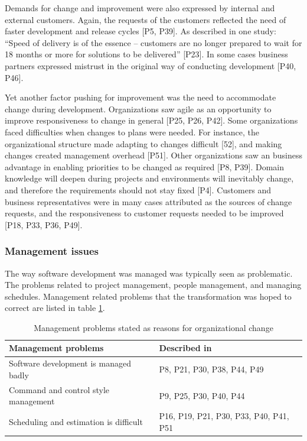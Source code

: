 \documentclass[preprint,authoryear,12pt]{elsarticle}
\begin{document}
Demands for change and improvement were also expressed by internal and external
customers. Again, the requests of the customers reflected the need of faster
development and release cycles [P5, P39]. As described in one study: ``Speed of
delivery is of the essence -- customers are no longer prepared to wait for 18
months or more for solutions to be delivered'' [P23]. In some cases business
partners expressed mistrust in the original way of conducting development [P40,
P46].

Yet another factor pushing for improvement was the need to accommodate change
during development. Organizations saw agile as an opportunity to improve
responsiveness to change in general [P25, P26, P42].
Some organizations faced difficulties when changes to plans were needed. For
instance, the organizational structure made adapting to changes difficult [52],
and making changes created management overhead [P51]. Other organizations saw an
business advantage in enabling priorities to be changed as required [P8, P39].
Domain knowledge will deepen during projects and environments will inevitably
change, and therefore the requirements should not stay fixed [P4].
Customers and business representatives were in many cases attributed as the
sources of change requests, and the responsiveness to customer requests needed
to be improved [P18, P33, P36, P49].

\subsubsection{Management issues}

The way software development was managed was typically seen as problematic. The
problems related to project management, people management, and managing
schedules. Management related problems that the transformation was hoped to
correct are listed in table \ref{table:reasonstochange_management}.

\begin{table}[b]
    \centering
    \begin{tabular}{ >{\raggedright\arraybackslash}p{}
                     >{\raggedright\arraybackslash}p{} }
        Management problems           &  Described in  \\
        \midrule
        Software development is managed badly   &  P8, P21, P30, P38, P44, P49  \\
        Command and control style management    &  P9, P25, P30, P40, P44  \\
        Scheduling and estimation is difficult  &  P16, P19, P21, P30, P33, P40, P41, P51  \\
        \bottomrule
    \end{tabular}
    \caption{Management problems stated as reasons for organizational change}
    \label{table:reasonstochange_management}
\end{table}
\end{document}
